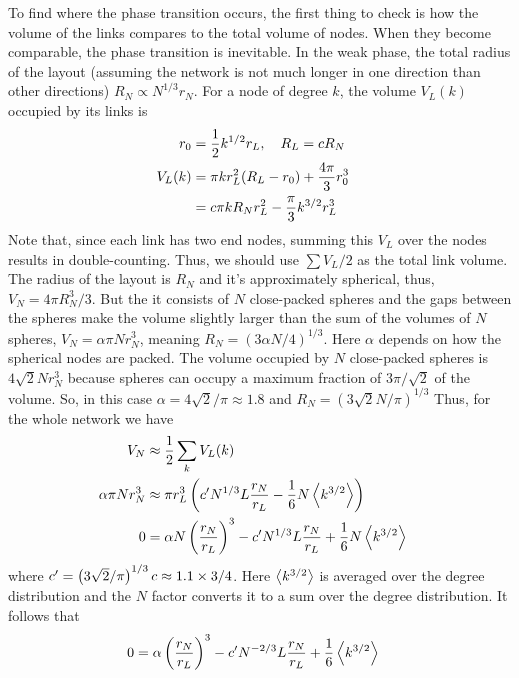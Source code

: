 \documentclass[endfloats,nofootinbib,preprint,floatfix,titlepage,superscriptaddress,linenumbers]{revtex4-1} %
\newcommand{\outNim}[1]{}
\begin{document}
{To find where the phase transition occurs, the first thing to check is how the volume of the links compares to the total volume of nodes. 
When they become comparable, the phase transition is inevitable. 
\outNim{
It may happen that density heterogeneity affects this, and we will work this case out as well.
But first, we consider the whole network.  
When link thickness is $r_L$, the $N$ links around the center hub can avoid each other only above a radius $r_0 = k^{1/2}_{\max} r_L /2 $ (SI 9). 
}%
In the weak phase, the total radius of the layout (assuming the network is not much longer in one direction than other directions) $R_N \propto N^{1/3} r_N$. 
For a node of degree $k$, the volume $V_L(k)$ occupied by its links is
\begin{align}
    r_0 & ={1\over 2}  k^{1/2} r_L, \quad R_L = c R_N \cr  
    V_L (k) & = \pi k r_L^2 (R_L-r_0) + {4\pi\over 3} r_0^3 \cr 
    &= c\pi k R_N r_L^2 %
    - { \pi \over 3}k^{3/2} r_L^3  
    \label{eq:VL}
\end{align}
Note that, since each link has two end nodes, summing this $V_L$ over the nodes results in double-counting. 
Thus, we should use $\sum V_L/2$ as the total link volume.  
The radius of the layout is $R_N$ and it's approximately spherical, thus, $V_N = 4\pi R_N^3/3 $. 
But the it consists of $N$ close-packed spheres and the gaps between the spheres make the volume slightly larger than the sum of the volumes of $N$ spheres, $V_N = \alpha \pi Nr_N^3$, meaning $R_N = (3\alpha N/4)^{1/3}$.  
Here $\alpha $ depends on how the spherical nodes are packed.
The volume occupied by $N$ close-packed spheres is %
$4\sqrt{2} N r_N^3$ because spheres can occupy a maximum fraction of $3\pi/\sqrt{2}$ of the volume. 
So, in this case $\alpha = 4\sqrt{2}/\pi \approx 1.8$ and $R_N = (3\sqrt{2} N/\pi)^{1/3}$
Thus, for the whole network we have %
\begin{align}
    V_N &\approx {1\over 2} \sum_k V_L(k) \cr
    \alpha \pi N r_N^3 &\approx \pi r_L^3 \left(c'  N^{1/3}L  {r_N \over r_L} 
    - { 1\over 6}N \left<k^{3/2}\right>\right)\cr 
    0 &= \alpha N \left({r_N\over r_L}\right)^3 - c' N^{1/3} L  {r_N \over r_L} 
    + { 1\over 6}N \left<k^{3/2}\right>
\end{align}
where $c' = \left({3\sqrt{2} / \pi}\right)^{1/3} c \approx 1.1 \times {3/ 4}$. 
Here $\left<k^{3/2}\right>$ is averaged over the degree distribution and the $N$ factor converts it to a sum over the degree distribution. 
It follows that 
\begin{align}
    0 &= \alpha \pr{{r_N\over r_L}}^3 -c' N^{-2/3} L  {r_N \over r_L} 
    + { 1\over 6} \be{k^{3/2}} %
    \label{eq:trans-full}
\end{align}


}
\end{document}
